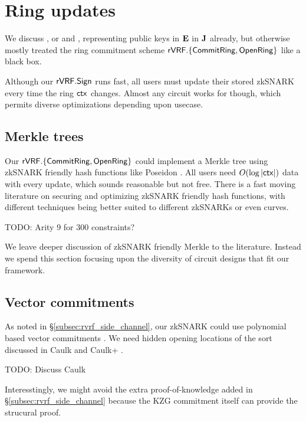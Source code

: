 \section{Ring updates}
\label{sec:ring_updates}

We discuss \pifast, or \pisk and \pipk, representing public keys
 in ${\mathbf{E}}$ in ${\mathbf{J}}$ already,
but otherwise mostly treated the ring commitment scheme
${\mathsf{rVRF}}.\{ {\mathsf{CommitRing}}, {\mathsf{OpenRing}} \}$ like a black box.

Although our ${\mathsf{rVRF}}.{\mathsf{Sign}}$ runs fast, all users must update their
stored zkSNARK \pipk every time the ring $\mathsf{ctx}$ changes.
Almost any circuit works for \pipk though,
 which permits diverse optimizations depending upon usecase.


\subsection{Merkle trees} %

Our ${\mathsf{rVRF}}.\{ {\mathsf{CommitRing}}, {\mathsf{OpenRing}} \}$ could implement a
Merkle tree using zkSNARK friendly hash functions like Poseidon \cite{poseidon}.
%
All users need $O(\log |\mathsf{ctx}|)$ data with every update, which sounds
reasonable but not free.  There is a fast moving literature on securing
and optimizing zkSNARK friendly hash functions, with different techniques
being better suited to different zkSNARKs or even curves.

TODO: Arity 9 for 300 constraints?   %

We leave deeper discussion of zkSNARK friendly Merkle to the literature.
Instead we spend this section focusing upon the diversity of circuit
designs that fit our framework.


\subsection{Vector commitments}

As noted in \S\ref{subsec:rvrf_side_channel}, our zkSNARK \pipk could use
polynomial based vector commitments \cite{KZG}. %
We need hidden opening locations of the sort discussed in Caulk \cite{caulk} and Caulk+ \cite{caulk+}.

TODO: Discuss Caulk

Interesstingly, we might avoid the extra proof-of-knowledge added
in \S\ref{subsec:rvrf_side_channel} because the KZG commitment itself
can provide the strucural proof.

